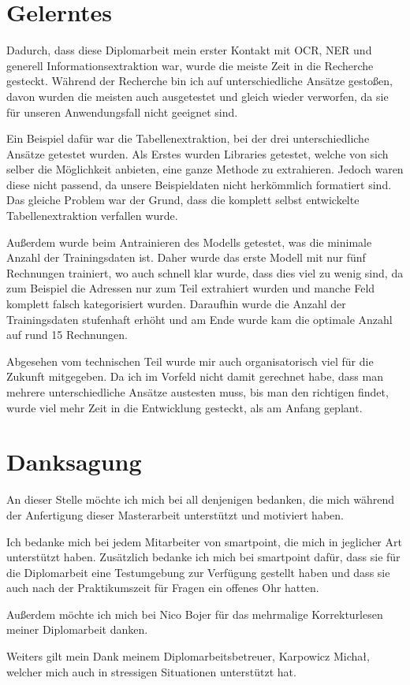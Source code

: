 
\section{Gelerntes}

Dadurch, dass diese Diplomarbeit mein erster Kontakt mit OCR, NER und generell Informationsextraktion war, wurde die meiste Zeit in die Recherche gesteckt. Während der Recherche bin ich auf unterschiedliche Ansätze gestoßen, davon wurden die meisten auch ausgetestet und gleich wieder verworfen, da sie für unseren Anwendungsfall nicht geeignet sind. 

Ein Beispiel dafür war die Tabellenextraktion, bei der drei unterschiedliche Ansätze getestet wurden. Als Erstes wurden Libraries getestet, welche von sich selber die Möglichkeit anbieten, eine ganze Methode zu extrahieren. Jedoch waren diese nicht passend, da unsere Beispieldaten nicht herkömmlich formatiert sind. Das gleiche Problem war der Grund, dass die komplett selbst entwickelte Tabellenextraktion verfallen wurde. 

Außerdem wurde beim Antrainieren des Modells getestet, was die minimale Anzahl der Trainingsdaten ist. Daher wurde das erste Modell mit nur fünf Rechnungen trainiert, wo auch schnell klar wurde, dass dies viel zu wenig sind, da zum Beispiel die Adressen nur zum Teil extrahiert wurden und manche Feld komplett falsch kategorisiert wurden. Daraufhin wurde die Anzahl der Trainingsdaten stufenhaft erhöht und am Ende wurde kam die optimale Anzahl auf rund 15 Rechnungen.

Abgesehen vom technischen Teil wurde mir auch organisatorisch viel für die Zukunft mitgegeben. Da ich im Vorfeld nicht damit gerechnet habe, dass man mehrere unterschiedliche Ansätze austesten muss, bis man den richtigen findet, wurde viel mehr Zeit in die Entwicklung gesteckt, als am Anfang geplant.

\section{Danksagung}

An dieser Stelle möchte ich mich bei all denjenigen bedanken, die mich während der Anfertigung dieser Masterarbeit unterstützt und motiviert haben.

Ich bedanke mich bei jedem Mitarbeiter von smartpoint, die mich in jeglicher Art unterstützt haben. Zusätzlich bedanke ich mich bei smartpoint dafür, dass sie für die Diplomarbeit eine Testumgebung zur Verfügung gestellt haben und dass sie auch nach der Praktikumszeit für Fragen ein offenes Ohr hatten. 

Außerdem möchte ich mich bei Nico Bojer für das mehrmalige Korrekturlesen meiner Diplomarbeit danken. 

Weiters gilt mein Dank meinem Diplomarbeitsbetreuer, Karpowicz Michał, welcher mich auch in stressigen Situationen unterstützt hat.